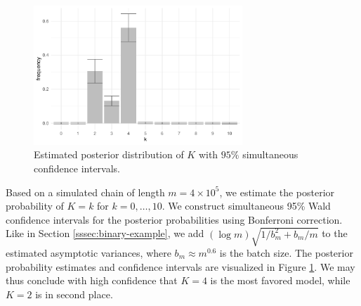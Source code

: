 \documentclass[12pt]{article}
\begin{document}
	\begin{figure}
		\centering
		\includegraphics[width=0.7\textwidth]{robustmcmc-bonf}
		\caption{Estimated posterior distribution of $K$ with $95\%$ simultaneous confidence intervals.} \label{fig:varmcmc-2}
	\end{figure}
	
	
	
	
	
	Based on a simulated chain of length $m = 4 \times 10^5$, we estimate the posterior probability of $K = k$ for $k = 0,\dots,10$.
	We construct simultaneous 95\% Wald confidence intervals for the posterior probabilities using Bonferroni correction.
	Like in Section \ref{sssec:binary-example}, we add $(\log m) \sqrt{1/b_m^2+b_m/m}$ to the estimated asymptotic variances, where $b_m \approx m^{0.6}$ is the batch size.
	The posterior probability estimates and confidence intervals are visualized in Figure \ref{fig:varmcmc-2}.
	We may thus conclude with high confidence that $K=4$ is the most favored model, while $K=2$ is in second place.
	
\end{document}

